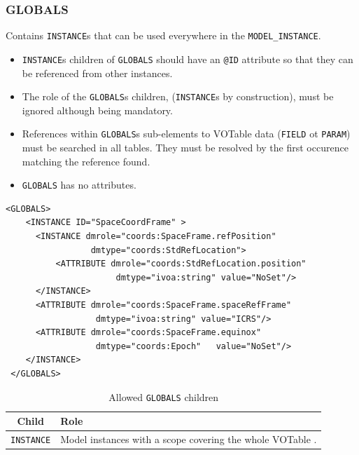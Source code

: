 \documentclass[11pt,a4paper]{ivoa}
\begin{document}
 \FloatBarrier

%
%

\subsubsection{GLOBALS}
 Contains  \texttt{INSTANCE}s  that can be used everywhere in the \texttt{MODEL\_INSTANCE}.

\begin{itemize}
    \item \texttt{INSTANCE}s children of \texttt{GLOBALS} should have an  \texttt{@ID} attribute so that they can be referenced from other instances.
    \item The role of the \texttt{GLOBALS}s children, (\texttt{INSTANCE}s by construction), must be ignored although being mandatory.
    \item References within \texttt{GLOBALS}s  sub-elements to VOTable data (\texttt{FIELD} ot \texttt{PARAM}) must be searched in all tables. 
            They must be resolved by the first occurence matching the reference found.
    \item \texttt{GLOBALS} has no attributes. 
\end{itemize}

\begin{lstlisting}[caption={GLOBALS block example},style=XML]
  <GLOBALS>
    <INSTANCE ID="SpaceCoordFrame" >
      <INSTANCE dmrole="coords:SpaceFrame.refPosition" 
                 dmtype="coords:StdRefLocation">
          <ATTRIBUTE dmrole="coords:StdRefLocation.position" 
                      dmtype="ivoa:string" value="NoSet"/>
      </INSTANCE>
      <ATTRIBUTE dmrole="coords:SpaceFrame.spaceRefFrame" 
                  dmtype="ivoa:string" value="ICRS"/>
      <ATTRIBUTE dmrole="coords:SpaceFrame.equinox" 
                  dmtype="coords:Epoch"   value="NoSet"/>
    </INSTANCE>
 </GLOBALS>
\end{lstlisting}




\begin{table}[!htbp]
\small
\centering
\begin{tabulary}{\linewidth}{|c|J|}       
       \hline 
           \textbf{Child} &  
           \textbf{Role}\\
       \hline         \hline  
            \texttt{INSTANCE}    &  
            Model instances with a scope covering the whole VOTable . \\       
       \hline 
     \end{tabulary}
     \caption{Allowed  \texttt{GLOBALS} children} 
     \label{tbl:globals-children}
 \end{table}
\end{document}
